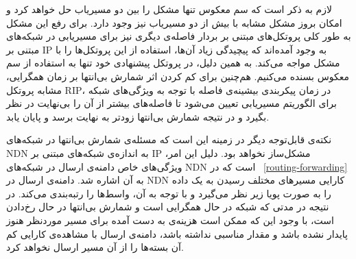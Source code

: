 لازم به ذکر است که سم معکوس تنها مشکل را بین دو مسیریاب حل خواهد کرد و امکان بروز مشکل مشابه با بیش از دو مسیریاب نیز وجود دارد. برای رفع این مشکل به طور کلی پروتکل‌های مبتنی بر بردار فاصله‌ی دیگری نیز برای مسیریابی در شبکه‌های مبتنی بر IP به وجود آمده‌اند که پیچیدگی زیاد آن‌ها، استفاده از این پروتکل‌ها را با مشکل مواجه می‌کند. به همین دلیل، در پروتکل پیشنهادی خود تنها به استفاده از سم معکوس بسنده می‌کنیم. هم‌چنین برای کم کردن اثر شمارش بی‌انتها بر زمان همگرایی، مشابه پروتکل RIP، در زمان پیکربندی بیشینه‌ی فاصله با توجه به ویژگی‌های شبکه برای الگوریتم مسیریابی تعیین می‌شود تا فاصله‌های بیشتر از آن را بی‌نهایت در نظر بگیرد و در نتیجه شمارش بی‌انتها زودتر به نهایت برسد و پایان یابد. 

نکته‌ی قابل‌توجه دیگر در زمینه این است که مسئله‌ی شمارش بی‌انتها در شبکه‌های NDN به اندازه‌ی شبکه‌های مبتنی بر IP مشکل‌ساز نخواهد بود. دلیل این امر، ویژگی‌های خاص دامنه‌ی ارسال در شبکه‌های NDN است که در ~\ref{routing-forwarding}  به آن اشاره شد. دامنه‌ی ارسال در NDN کارایی مسیرهای مختلف رسیدن به یک داده را به صورت پویا زیر نظر می‌گیرد و با توجه به آن، واسط‌ها را رتبه‌بندی می‌کند. در نتیجه در مدتی که شبکه در حال همگرایی است و شمارش بی‌انتها در حال رخ‌دادن است، با وجود این که ممکن است هزینه‌ی به دست آمده برای مسیر موردنظر هنوز پایدار نشده باشد و مقدار مناسبی نداشته باشد، دامنه‌ی ارسال با مشاهده‌ی کارایی کم آن بسته‌ها را از آن مسیر ارسال نخواهد کرد. 
